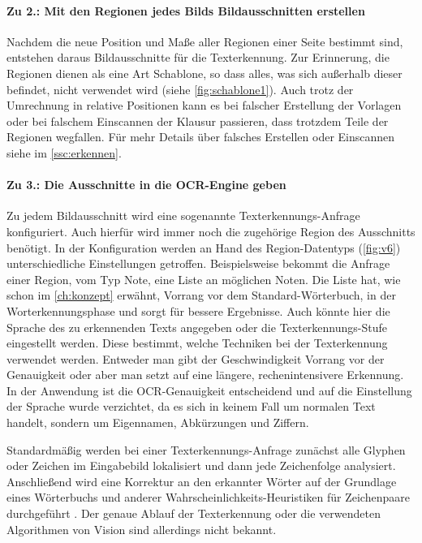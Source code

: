 \documentclass[notables, nomenclature, oneside, 150]{HSMW-Thesis}
\begin{document}
				\paragraph*{Zu 2.: Mit den Regionen jedes Bilds Bildausschnitten erstellen}
				Nachdem die neue Position und Maße aller Regionen einer Seite bestimmt sind, entstehen daraus Bildausschnitte für die Texterkennung. Zur Erinnerung, die Regionen dienen als eine Art Schablone, so dass alles, was sich außerhalb dieser befindet, nicht verwendet wird (siehe \autoref{fig:schablone1}). Auch trotz der Umrechnung in relative Positionen kann es bei falscher Erstellung der Vorlagen oder bei falschem Einscannen der Klausur passieren, dass trotzdem Teile der Regionen wegfallen. Für mehr Details über falsches Erstellen oder Einscannen siehe im \autoref{ssc:erkennen}.
				
				\paragraph*{Zu 3.: Die Ausschnitte in die OCR-Engine geben}
				Zu jedem Bildausschnitt wird eine sogenannte Texterkennungs-Anfrage konfiguriert. Auch hierfür wird immer noch die zugehörige Region des Ausschnitts benötigt. In der Konfiguration werden an Hand des Region-Datentyps (\ref{fig:v6}) unterschiedliche Einstellungen getroffen. Beispielsweise bekommt die Anfrage einer Region, vom Typ Note, eine Liste an möglichen Noten. Die Liste hat, wie schon im \autoref{ch:konzept} erwähnt, Vorrang vor dem Standard-Wörterbuch, in der Worterkennungsphase und sorgt für bessere Ergebnisse. Auch könnte hier die Sprache des zu erkennenden Texts angegeben oder die  Texterkennungs-Stufe eingestellt werden. Diese bestimmt, welche Techniken bei der Texterkennung verwendet werden. Entweder man gibt der Geschwindigkeit Vorrang vor der Genauigkeit oder aber man setzt auf eine längere, rechenintensivere Erkennung. In der Anwendung ist die OCR-Genauigkeit entscheidend und auf die Einstellung der Sprache wurde verzichtet, da es sich in keinem Fall um normalen Text handelt, sondern um Eigennamen, Abkürzungen und Ziffern.
						
				Standardmäßig werden bei einer Texterkennungs-Anfrage zunächst alle Glyphen oder Zeichen im Eingabebild lokalisiert und dann jede Zeichenfolge analysiert. Anschließend wird eine Korrektur an den erkannter Wörter auf der Grundlage eines Wörterbuchs und anderer Wahrscheinlichkeits-Heuristiken für Zeichenpaare durchgeführt \cite{apple_text_2019}. Der genaue Ablauf der Texterkennung oder die verwendeten Algorithmen von Vision sind allerdings nicht bekannt. 
				
\end{document}
